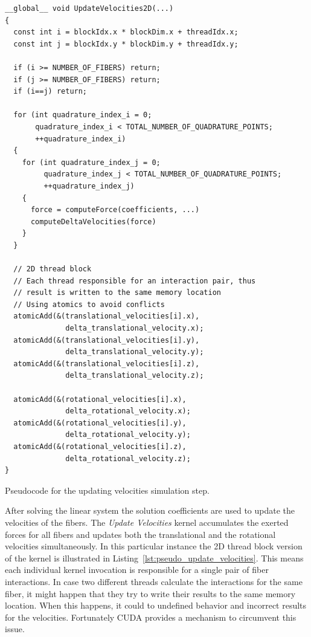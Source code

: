 \documentclass[a4paper,11pt]{kth-mag}
\begin{document}
\begin{listing}[!htbp]
  \centering
  \begin{verbatim}
__global__ void UpdateVelocities2D(...)
{
  const int i = blockIdx.x * blockDim.x + threadIdx.x;
  const int j = blockIdx.y * blockDim.y + threadIdx.y;

  if (i >= NUMBER_OF_FIBERS) return;
  if (j >= NUMBER_OF_FIBERS) return;
  if (i==j) return;

  for (int quadrature_index_i = 0;
       quadrature_index_i < TOTAL_NUMBER_OF_QUADRATURE_POINTS;
       ++quadrature_index_i)
  {
    for (int quadrature_index_j = 0;
         quadrature_index_j < TOTAL_NUMBER_OF_QUADRATURE_POINTS;
         ++quadrature_index_j)
    {
      force = computeForce(coefficients, ...)
      computeDeltaVelocities(force)
    }
  }

  // 2D thread block
  // Each thread responsible for an interaction pair, thus
  // result is written to the same memory location
  // Using atomics to avoid conflicts
  atomicAdd(&(translational_velocities[i].x),
              delta_translational_velocity.x);
  atomicAdd(&(translational_velocities[i].y),
              delta_translational_velocity.y);
  atomicAdd(&(translational_velocities[i].z),
              delta_translational_velocity.z);

  atomicAdd(&(rotational_velocities[i].x),
              delta_rotational_velocity.x);
  atomicAdd(&(rotational_velocities[i].y),
              delta_rotational_velocity.y);
  atomicAdd(&(rotational_velocities[i].z),
              delta_rotational_velocity.z);
}
  \end{verbatim}
  \caption{Pseudocode for the updating velocities simulation step.}
  \label{lst:pseudo_update_velocities}
\end{listing}

After solving the linear system the solution coefficients are used to update the velocities of the fibers. The \emph{Update Velocities} kernel accumulates the exerted forces for all fibers and updates both the translational and the rotational velocities simultaneously. In this particular instance the 2D thread block version of the kernel is illustrated in Listing~\ref{lst:pseudo_update_velocities}. This means each individual kernel invocation is responsible for a single pair of fiber interactions. In case two different threads calculate the interactions for the same fiber, it might happen that they try to write their results to the same memory location. When this happens, it could to undefined behavior and incorrect results for the velocities. Fortunately CUDA provides a mechanism to circumvent this issue. 
\end{document}
